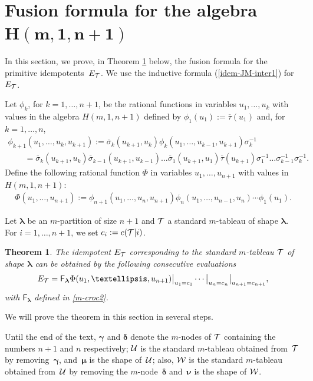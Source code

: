 \documentclass[11pt]{article}
\newcommand{\bsi}{{\overline{\sigma}}}
\newcommand{\bta}{{\overline{\tau}}}
\newcommand{\lam}{\boldsymbol{\lambda}}
\newcommand{\num}{\boldsymbol{\nu}}
\newcommand{\mum}{\boldsymbol{\mu}}
\newcommand{\gam}{\boldsymbol{\gamma}}
\newcommand{\dem}{\boldsymbol{\delta}}
\newtheorem{Theorem}{Theorem}
\begin{document}
\section[Fusion formula for the algebra $H(m,1,n+1)$]{Fusion formula for the algebra $\boldsymbol{H(m,1,n+1)}$}\label{sec-fus}

In this section, we prove, in Theorem \ref{prop-fus1} below, the fusion formula for the primitive idempo\-tents~$E_{{\cal{T}}}$. We use the inductive formula (\ref{idem-JM-inter1}) for $E_{{\cal{T}}}$.


Let $\phi_{k}$, for $k=1,\dots,n+1$, be the rational functions in variables $u_1,\dots,u_k$ with values in the algebra $H(m,1,n+1)$ def\/ined by
$\phi_{1}(u_1):=\bta(u_1)$ and, for $k=1,\dots,n$,
 \begin{gather*}\phi_{k+1}(u_1,\dots,u_k,u_{k+1}):=
\bsi_k(u_{k+1},u_k)\phi_{k}(u_1,\dots,u_{k-1},u_{k+1})\sigma_k^{-1}\\
\qquad {} =   \bsi_{k}(u_{k+1},u_k)\bsi_{k-1}(u_{k+1},u_{k-1})\dots \bsi_{1}(u_{k+1},u_1)\bta(u_{k+1})\sigma_1^{-1}\dots \sigma_{k-1}^{-1}\sigma_k^{-1}  . \end{gather*}
Def\/ine the following rational function $\Phi$ in variables $u_1,\dots,u_{n+1}$ with values in $H(m,1,n+1)$:
\begin{gather*}%
\Phi(u_1,\dots,u_{n+1}):=
\phi_{n+1}(u_1,\dots,u_n,u_{n+1})
\phi_{n}(u_1,\dots,u_{n-1},u_{n}) \cdots \phi_{1}(u_1) .
\end{gather*}


Let $\lam$ be an $m$-partition of size $n+1$ and ${\cal{T}}$ a standard $m$-tableau of shape $\lam$. For $i=1,\dots,n+1$, we set $c_i:=c({\cal{T}}|i)$.

\begin{Theorem}\label{prop-fus1}
The idempotent $E_{{\cal{T}}}$ corresponding to the standard $m$-tableau ${\cal{T}}$ of shape $\lam$ can be obtained by the following consecutive evaluations
\begin{gather*}%
E_{{\cal{T}}}=\mathsf{F}_{\lam}\Phi(u_1,\dots,u_{n+1})\bigr\rvert_{u_1=c_1}\cdots\bigr\rvert_{u_n=c_n}\bigr\rvert_{u_{n+1}=c_{n+1}}  ,
\end{gather*}
with $\mathsf{F}_{\lam}$ defined in \eqref{m-croc2}.
\end{Theorem}

We will prove the theorem in this section in several steps.


Until the end of the text, $\gam$ and $\dem$
denote the $m$-nodes of $\cal{T}$ containing the numbers $n+1$ and $n$  respectively; ${\cal{U}}$ is the standard $m$-tableau obtained from~${\cal{T}}$ by removing~$\gam$, and~$\mum$ is the shape of~${\cal{U}}$; also, ${\cal{W}}$ is the standard $m$-tableau obtained from~${\cal{U}}$ by removing the $m$-node~$\dem$ and~$\num$ is the shape of ${\cal{W}}$.
\end{document}
